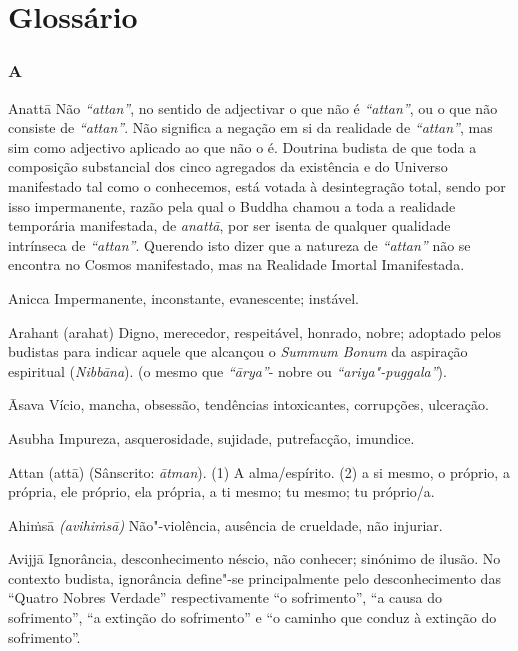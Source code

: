 \chapter{Glossário}

\subsection{A}

\begin{glossarydescription}

\item[Anattā] Não \emph{“attan”}, no sentido de adjectivar o que não é
\emph{“attan”}, ou o que não consiste de \emph{“attan”}. Não significa a
negação em si da realidade de \emph{“attan”}, mas sim como adjectivo
aplicado ao que não o é. Doutrina budista de que toda a composição substancial
dos cinco agregados da existência e do Universo manifestado tal como o
conhecemos, está votada à desintegração total, sendo por isso impermanente,
razão pela qual o Buddha chamou a toda a realidade temporária manifestada, de
\emph{anattā}, por ser isenta de qualquer qualidade intrínseca de
\emph{“attan”}. Querendo isto dizer que a natureza de \emph{“attan”} não
se encontra no Cosmos manifestado, mas na Realidade Imortal Imanifestada.

\item[Anicca] Impermanente, inconstante, evanescente; instável.

\item[Arahant (arahat)] Digno, merecedor, respeitável, honrado, nobre; adoptado
pelos budistas para indicar aquele que alcançou o \emph{Summum Bonum} da
aspiração espiritual (\emph{Nibbāna}). (o mesmo que \emph{“ārya”}- nobre ou
\emph{“ariya"-puggala”}).

\item[Āsava] Vício, mancha, obsessão, tendências intoxicantes, corrupções,
ulceração.

\item[Asubha] Impureza, asquerosidade, sujidade, putrefacção, imundice.

\item[Attan (attā)] (Sânscrito: \emph{ātman}). (1) A alma/espírito. (2) a si
mesmo, o próprio, a própria, ele próprio, ela própria, a ti mesmo; tu mesmo; tu
próprio/a.

\item[Ahiṁsā] \emph{(avihiṁsā)} Não"-violência, ausência de crueldade, não
injuriar.

\item[Avijjā] Ignorância, desconhecimento néscio, não conhecer; sinónimo de
ilusão. No contexto budista, ignorância define"-se principalmente pelo
desconhecimento das “Quatro Nobres Verdade” respectivamente “o sofrimento”,
“a causa do sofrimento”, “a extinção do sofrimento” e “o caminho que conduz
à extinção do sofrimento”.

\end{glossarydescription}

